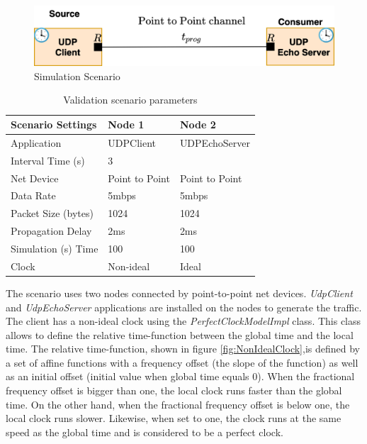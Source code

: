 \documentclass[times, twoside, watermark]{zHenriquesLab-StyleBioRxiv}
\begin{document}
\begin{figure}[h]
    \centering
    \includegraphics[width=0.8\linewidth]{Figures/ClockValidationScenario1.png}
    \caption{Simulation Scenario }
    \label{fig:SimulationScenario}
\end{figure}
\begin{table}[h]
    \centering
    \begin{tabular}{|p{3cm}|p{2.3cm}|p{2.3cm}|}
       \hline
         \textbf{Scenario Settings} & \textbf{Node 1} & \textbf{Node 2}  \\ [0.5ex] 
         \hline\hline
         Application & UDPClient & UDPEchoServer  \\ 
         \hline
         Interval Time (s) & 3 &\\
         \hline
         Net Device & Point to Point  & Point to Point  \\
         \hline
         Data Rate & 5mbps & 5mbps  \\
         \hline
         Packet Size (bytes) & 1024 & 1024 \\
         \hline
         Propagation Delay & 2ms & 2ms \\
         \hline
         Simulation (s) Time & 100 & 100 \\ 
         \hline
         Clock & Non-ideal & Ideal \\
         \hline 
    \end{tabular}
    \caption{Validation scenario parameters}
    \label{tab:ScenarioParamsSimple}
\end{table}

The scenario uses two nodes connected by point-to-point net devices. \textit{UdpClient} and \textit{UdpEchoServer} applications are installed on the nodes to generate the traffic. The client has a non-ideal clock using the \textit{PerfectClockModelImpl} class. This class allows to define the relative time-function between the global time and the local time. The relative time-function, shown in figure \ref{fig:NonIdealClock},is defined by a set of affine functions with a frequency offset (the slope of the function) as well as an initial offset (initial value when global time equals 0). When the fractional frequency offset is bigger than one, the local clock runs faster than the global time. On the other hand, when the fractional frequency offset is below one, the local clock runs slower. Likewise, when set to one, the clock runs at the same speed as the global time and is considered to be a perfect clock. 
\end{document}
